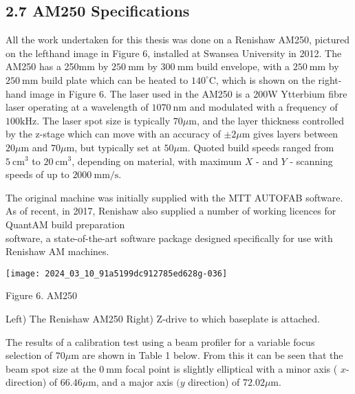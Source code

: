 \documentclass[10pt]{article}
\begin{document}
\subsection*{2.7 AM250 Specifications}
All the work undertaken for this thesis was done on a Renishaw AM250, pictured on the lefthand image in Figure 6, installed at Swansea University in 2012. The AM250 has a 250mm by $250 \mathrm{~mm}$ by $300 \mathrm{~mm}$ build envelope, with a $250 \mathrm{~mm}$ by $250 \mathrm{~mm}$ build plate which can be heated to $140^{\circ} \mathrm{C}$, which is shown on the right-hand image in Figure 6. The laser used in the AM250 is a 200W Ytterbium fibre laser operating at a wavelength of $1070 \mathrm{~nm}$ and modulated with a frequency of $100 \mathrm{kHz}$. The laser spot size is typically $70 \mu \mathrm{m}$, and the layer thickness controlled by the z-stage which can move with an accuracy of $\pm 2 \mu \mathrm{m}$ gives layers between $20 \mu \mathrm{m}$ and $70 \mu \mathrm{m}$, but typically set at $50 \mu \mathrm{m}$. Quoted build speeds ranged from $5 \mathrm{~cm}^{3}$ to $20 \mathrm{~cm}^{3}$, depending on material, with maximum $X$ - and $Y$ - scanning speeds of up to $2000 \mathrm{~mm} / \mathrm{s}$.

The original machine was initially supplied with the MTT AUTOFAB software. As of recent, in 2017, Renishaw also supplied a number of working licences for QuantAM build preparation\\
software, a state-of-the-art software package designed specifically for use with Renishaw AM machines.

\begin{center}
\texttt{[image: 2024\_03\_10\_91a5199dc912785ed628g-036]}
\end{center}

Figure 6. AM250

Left) The Renishaw AM250 Right) Z-drive to which baseplate is attached.

The results of a calibration test using a beam profiler for a variable focus selection of $70 \mu \mathrm{m}$ are shown in Table 1 below. From this it can be seen that the beam spot size at the $0 \mathrm{~mm}$ focal point is slightly elliptical with a minor axis ( $x$-direction) of $66.46 \mu \mathrm{m}$, and a major axis $(y$ direction) of $72.02 \mu \mathrm{m}$.
\end{document}
